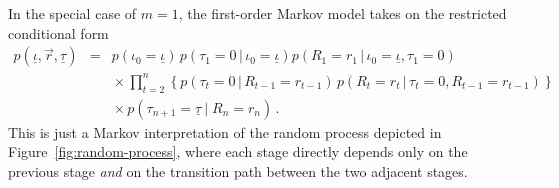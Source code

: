 \documentclass[a4paper]{article}
\begin{document}
In the special case of $m=1$, the first-order Markov model takes on the restricted conditional form
\begin{eqnarray}
p(\underline{\iota},\vec{r},\underline{\tau}) & = &
p(\iota_0\!=\!\underline{\iota})\,p(\tau_1\!=\!0\,|\,\iota_0\!=\!\underline{\iota})
p(R_1\!=\!r_1\,|\,\iota_0\!=\!\underline{\iota},\tau_1\!=\!0)
\nonumber\\&&
{}\times\prod_{t=2}^{n}\left\{p(\tau_t\!=\!0\,|\,R_{t-1}\!=\!r_{t-1})
\,p(R_t\!=\!r_t\,|\,\tau_t\!=\!0,R_{t-1}\!=\!r_{t-1})\right\}
\nonumber\\&&
{}\times p(\tau_{n+1}\!=\!\underline{\tau}\:|\;R_n\!=\!r_n)
\,.
\end{eqnarray}
This is just a Markov interpretation of the random process depicted in Figure~\ref{fig:random-process},
where each stage directly depends only on the previous stage {\em and} on the transition path between the two adjacent stages.
\end{document}
